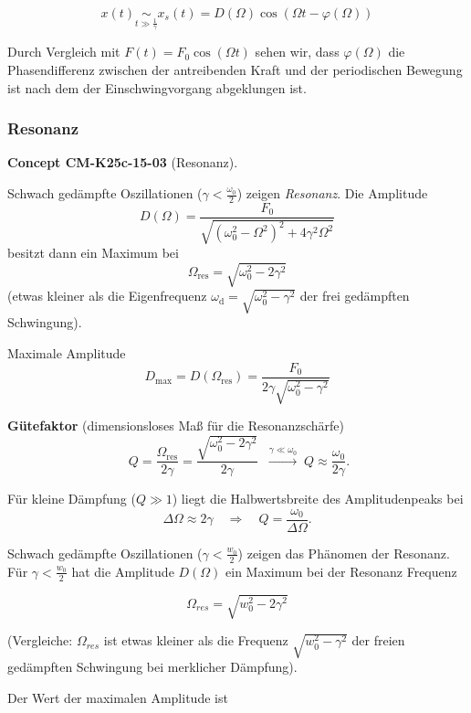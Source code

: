 \documentclass[10pt, letterpaper]{article}
\newcommand{\CustomHeading}[3]{%
  \par\medskip\noindent%
  \textbf{#1 #2} \textnormal{(#3)}.\enskip%
}
\newenvironment{CONC}[2]{\begin{unitbox}\CustomHeading{Concept}{#1}{#2}}{\end{unitbox}}
\begin{document}
\[x(t) \underset{t\gg\frac{1}{\gamma}}{\sim} x_s(t) = D(\Omega)\cos(\Omega t-\varphi(\Omega))\]

Durch Vergleich mit $F(t)=F_0\cos(\Omega t)$ sehen wir, dass $\varphi(\Omega)$ die Phasendifferenz zwischen der antreibenden Kraft und der periodischen Bewegung ist nach dem der Einschwingvorgang abgeklungen ist.



\subsubsection*{Resonanz}


\begin{CONC}{CM-K25c-15-03}{Resonanz}
Schwach gedämpfte Oszillationen (\(\gamma < \tfrac{\omega_0}{2}\)) zeigen \emph{Resonanz}.  
Die Amplitude 
\[
  D(\Omega)=\frac{F_0}
                 {\sqrt{(\omega_0^{2}-\Omega^{2})^{2}+4\gamma^{2}\Omega^{2}}}
\]
besitzt dann ein Maximum bei
\[
  \boxed{\;\Omega_{\text{res}}
         =\sqrt{\omega_{0}^{2}-2\gamma^{2}}\;}
\]
(etwas kleiner als die Eigenfrequenz  
\(\omega_{\mathrm d}=\sqrt{\omega_{0}^{2}-\gamma^{2}}\)  
der frei gedämpften Schwingung).

Maximale Amplitude
\[
  \boxed{\;
    D_{\max}=D(\Omega_{\text{res}})
            =\frac{F_0}{2\gamma\sqrt{\omega_{0}^{2}-\gamma^{2}}}\;}
\]

\textbf{Gütefaktor} (dimensionsloses Maß für die Resonanzschärfe)
\[
  \boxed{\;
    Q=\frac{\Omega_{\text{res}}}{2\gamma}
      =\frac{\sqrt{\omega_{0}^{2}-2\gamma^{2}}}{2\gamma}\;}
  \;\xrightarrow{\gamma\ll\omega_{0}}\;
  Q\approx\frac{\omega_{0}}{2\gamma}.
\]

Für kleine Dämpfung (\(Q\gg 1\)) liegt die Halbwertsbreite des Amplituden­peaks bei
\[
  \Delta\Omega \approx 2\gamma
  \quad\Longrightarrow\quad
  Q = \frac{\omega_{0}}{\Delta\Omega}.
\]
\end{CONC}



Schwach gedämpfte Oszillationen ($\gamma < \frac{w_0}{2}$) zeigen das Phänomen der Resonanz. Für $\gamma < \frac{w_0}{2}$ hat die Amplitude $D(\Omega)$ ein Maximum bei der Resonanz Frequenz

\[\Omega_{res} = \sqrt{w_0^2-2\gamma^2}\]

(Vergleiche: $\Omega_{res}$ ist etwas kleiner als die Frequenz $\sqrt{w_0^2-\gamma^2}$ der freien gedämpften Schwingung bei merklicher Dämpfung).

Der Wert der maximalen Amplitude ist
\end{document}
